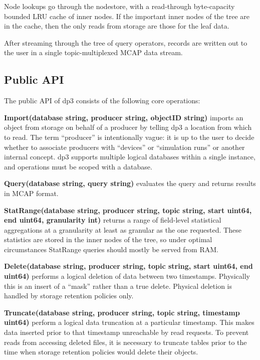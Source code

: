 \documentclass[9pt,twocolumn]{article}
\newcommand{\q}[1]{``#1''}
\begin{document}
    Node lookups go through the nodestore, with a read-through byte-capacity
    bounded LRU cache of inner nodes. If the important inner nodes of the tree are
    in the cache, then the only reads from storage are those for the leaf data.

    After streaming through the tree of query operators, records are written out
    to the user in a single topic-multiplexed MCAP data stream.

    \subsection{Public API} \label{api}
    The public API of dp3 consists of the following core operations:

    \textbf{Import(database string, producer string, objectID string)} imports an
    object from storage on behalf of a producer by telling dp3 a location from
    which to read. The term \q{producer} is intentionally vague: it is up to the
    user to decide whether to associate producers with \q{devices} or
    \q{simulation runs} or another internal concept. dp3 supports multiple
    logical databases within a single instance, and operations must be scoped
    with a database.

    \textbf{Query(database string, query string)} evaluates the query and
    returns results in MCAP format.

    \textbf{StatRange(database string, producer string, topic string, start
    uint64, end uint64, granularity int)} returns a range of field-level
    statistical aggregations at a granularity at least as granular as the one
    requested. These statistics are stored in the inner nodes of the tree, so
    under optimal circumstances StatRange queries should mostly be served from
    RAM.

    \textbf{Delete(database string, producer string, topic string, start uint64,
    end uint64)} performs a logical deletion of data between two timestamps.
    Physically this is an insert of a \q{mask} rather than a true delete.
    Physical deletion is handled by storage retention policies only.

    \textbf{Truncate(database string, producer string, topic string, timestamp
    uint64)} perform a logical data truncation at a particular timestamp. This
    makes data inserted prior to that timestamp unreachable by read requests. To
    prevent reads from accessing deleted files, it is necessary to truncate
    tables prior to the time when storage retention policies would delete their
    objects.
\end{document}
